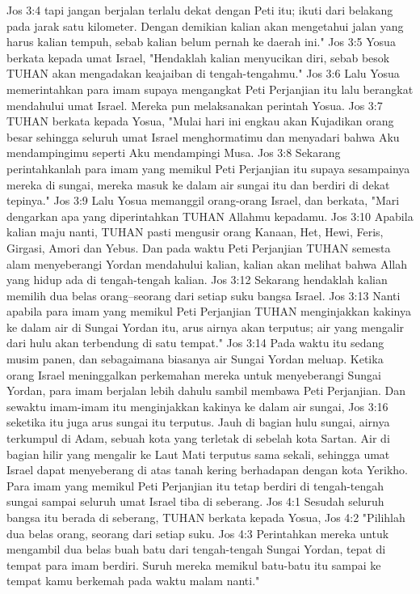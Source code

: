 Jos 3:4  tapi jangan berjalan terlalu dekat dengan Peti itu; ikuti dari belakang pada jarak satu kilometer. Dengan demikian kalian akan mengetahui jalan yang harus kalian tempuh, sebab kalian belum pernah ke daerah ini."
Jos 3:5  Yosua berkata kepada umat Israel, "Hendaklah kalian menyucikan diri, sebab besok TUHAN akan mengadakan keajaiban di tengah-tengahmu."
Jos 3:6  Lalu Yosua memerintahkan para imam supaya mengangkat Peti Perjanjian itu lalu berangkat mendahului umat Israel. Mereka pun melaksanakan perintah Yosua.
Jos 3:7  TUHAN berkata kepada Yosua, "Mulai hari ini engkau akan Kujadikan orang besar sehingga seluruh umat Israel menghormatimu dan menyadari bahwa Aku mendampingimu seperti Aku mendampingi Musa.
Jos 3:8  Sekarang perintahkanlah para imam yang memikul Peti Perjanjian itu supaya sesampainya mereka di sungai, mereka masuk ke dalam air sungai itu dan berdiri di dekat tepinya."
Jos 3:9  Lalu Yosua memanggil orang-orang Israel, dan berkata, "Mari dengarkan apa yang diperintahkan TUHAN Allahmu kepadamu.
Jos 3:10  Apabila kalian maju nanti, TUHAN pasti mengusir orang Kanaan, Het, Hewi, Feris, Girgasi, Amori dan Yebus. Dan pada waktu Peti Perjanjian TUHAN semesta alam menyeberangi Yordan mendahului kalian, kalian akan melihat bahwa Allah yang hidup ada di tengah-tengah kalian.
Jos 3:12  Sekarang hendaklah kalian memilih dua belas orang--seorang dari setiap suku bangsa Israel.
Jos 3:13  Nanti apabila para imam yang memikul Peti Perjanjian TUHAN menginjakkan kakinya ke dalam air di Sungai Yordan itu, arus airnya akan terputus; air yang mengalir dari hulu akan terbendung di satu tempat."
Jos 3:14  Pada waktu itu sedang musim panen, dan sebagaimana biasanya air Sungai Yordan meluap. Ketika orang Israel meninggalkan perkemahan mereka untuk menyeberangi Sungai Yordan, para imam berjalan lebih dahulu sambil membawa Peti Perjanjian. Dan sewaktu imam-imam itu menginjakkan kakinya ke dalam air sungai,
Jos 3:16  seketika itu juga arus sungai itu terputus. Jauh di bagian hulu sungai, airnya terkumpul di Adam, sebuah kota yang terletak di sebelah kota Sartan. Air di bagian hilir yang mengalir ke Laut Mati terputus sama sekali, sehingga umat Israel dapat menyeberang di atas tanah kering berhadapan dengan kota Yerikho. Para imam yang memikul Peti Perjanjian itu tetap berdiri di tengah-tengah sungai sampai seluruh umat Israel tiba di seberang.
Jos 4:1  Sesudah seluruh bangsa itu berada di seberang, TUHAN berkata kepada Yosua,
Jos 4:2  "Pilihlah dua belas orang, seorang dari setiap suku.
Jos 4:3  Perintahkan mereka untuk mengambil dua belas buah batu dari tengah-tengah Sungai Yordan, tepat di tempat para imam berdiri. Suruh mereka memikul batu-batu itu sampai ke tempat kamu berkemah pada waktu malam nanti."
